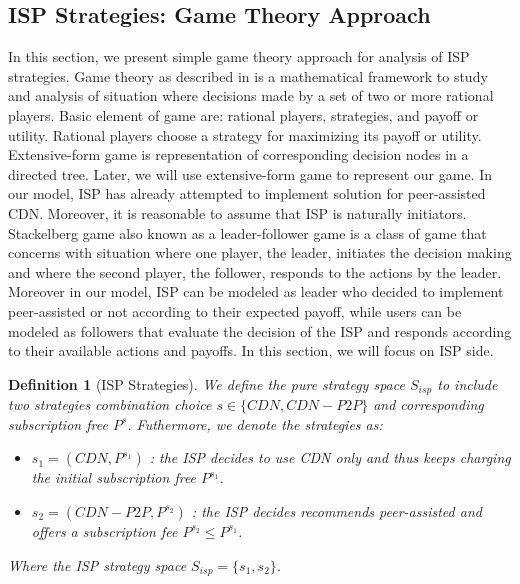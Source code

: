 \documentclass[paper]{ieice}
\begin{document}
\subsection{ISP Strategies: Game Theory Approach}
In this section, we present simple game theory approach for analysis of ISP strategies.
Game theory as described in \cite{gametheory} is a mathematical framework to study and analysis of situation where decisions made by a set of two or more rational players.
Basic element of game are: rational players, strategies, and payoff or utility.  
Rational players choose a strategy for maximizing its payoff or utility. 
Extensive-form game is representation of corresponding decision nodes in a directed tree.
Later, we will use extensive-form game to represent our game.
In our model, ISP has already attempted to implement solution for peer-assisted CDN.
Moreover, it is reasonable to assume that ISP is naturally initiators.  
Stackelberg game also known as a leader-follower game is a class of game that concerns with situation where one player, the leader, initiates the decision making and where the second player, the follower, responds to the actions by the leader.  
Moreover in our model, ISP can be modeled as leader who decided to implement peer-assisted or not according to their expected payoff, while users can be modeled as followers that evaluate the decision of the ISP and responds according to their available actions and payoffs.
In this section, we will focus on ISP side.  

\newtheorem{theorem}{Definition}
\begin{theorem}[ISP Strategies]
We define the pure strategy space $S_{isp}$ to include two strategies combination choice $s \in \{CDN, CDN-P2P\}$ and corresponding subscription free $P^{s}$.
Futhermore, we denote the strategies as:
\begin{itemize}
	\item $s_1 = (CDN, P^{s_1})$ : the ISP decides to use CDN only and thus keeps charging the initial subscription free $P^{s_1}$.
	\item $s_2 = (CDN-P2P, P^{s_2})$ : the ISP decides recommends peer-assisted and offers a subscription fee $P^{s_2} \le P^{s_1}$.
\end{itemize}
Where the ISP strategy space $S_{isp} = \{s_1,s_2\}$.
\end{theorem}
\end{document}
